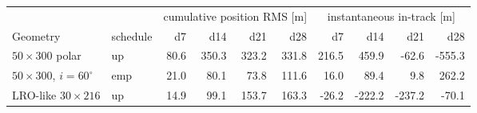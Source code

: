 \begin{tabular}{@{}llrrrrrrrr@{}}
\toprule
& & \multicolumn{4}{c}{cumulative position RMS [m]} & \multicolumn{4}{c}{instantaneous in-track [m]} \\
\cmidrule(lr){3-6}\cmidrule(l){7-10}
Geometry & schedule & d7 & d14 & d21 & d28 & d7 & d14 & d21 & d28 \\
\midrule
$50\times300$ polar & up & 80.6 & 350.3 & 323.2 & 331.8 & 216.5 & 459.9 & -62.6 & -555.3 \\
$50\times300$, $i=60^\circ$ & emp & 21.0 & 80.1 & 73.8 & 111.6 & 16.0 & 89.4 & 9.8 & 262.2 \\
LRO-like $30\times216$ & up & 14.9 & 99.1 & 153.7 & 163.3 & -26.2 & -222.2 & -237.2 & -70.1 \\
\bottomrule
\end{tabular}
